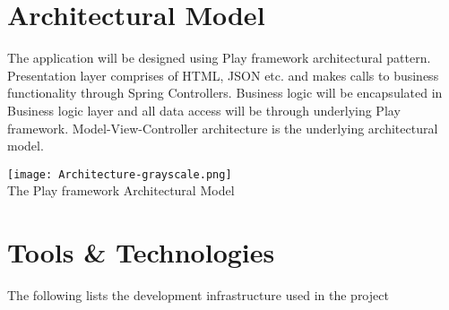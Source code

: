\documentclass[hidelinks,a4paper]{article}
\begin{document}
	\noindent
	\newpage
						
	\section{Architectural Model}
	The application will be designed using Play framework architectural pattern. Presentation layer comprises of HTML, JSON etc. and makes calls to business functionality through Spring Controllers. Business logic will be encapsulated in Business logic layer and all data access will be through underlying Play framework. Model-View-Controller architecture is the underlying architectural model.
	
	\bigskip
	\begin{center}
	
	\texttt{[image: Architecture-grayscale.png]}\\[1em]
	{The Play framework Architectural Model}
	
	\end{center}
	\newpage
	
	\section{Tools \& Technologies}
	The following lists the development infrastructure used in the project
	
\end{document}
